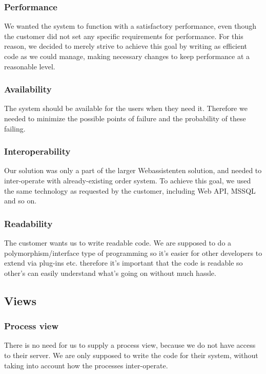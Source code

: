 \subsubsection{Performance}
We wanted the system to function with a satisfactory performance, even though the customer did not set any specific requirements for performance. For this reason, we decided to merely strive to achieve this goal by writing as efficient code as we could manage, making necessary changes to keep performance at a reasonable level. %

\subsubsection{Availability}
The system should be available for the users when they need it. Therefore we needed to minimize the possible points of failure and the probability of these failing. %

\subsubsection{Interoperability}
Our solution was only a part of the larger Webassistenten solution, and needed to inter-operate with already-existing order system. To achieve this goal, we used the same technology as requested by the customer, including Web API, MSSQL and so on.

\subsubsection{Readability}
The customer wants us to write readable code. We are supposed to do a polymorphism/interface type of programming so it's easier for other developers to extend via plug-ins etc. therefore it's important that the code is readable so other's can easily understand what's going on without much hassle. %

\subsection{Views}


\subsubsection{Process view}
There is no need for us to supply a process view, because we do not have access to their server. We are only supposed to write the code for their system, without taking into account how the processes inter-operate.
